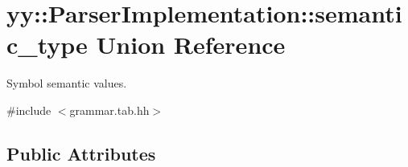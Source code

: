 \hypertarget{unionyy_1_1_parser_implementation_1_1semantic__type}{
\section{yy::ParserImplementation::semantic\_\-type Union Reference}
\label{unionyy_1_1_parser_implementation_1_1semantic__type}
}


Symbol semantic values.  




{\ttfamily \#include $<$grammar.tab.hh$>$}

\subsection*{Public Attributes}
